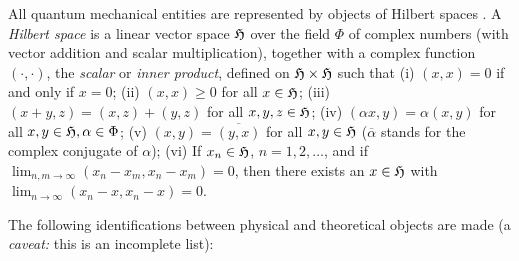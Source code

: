 All quantum
mechanical entities are represented by objects
of Hilbert spaces \cite{v-neumann-49}. A {\em Hilbert space} is a linear
vector space ${\cal H}$ over the field $\Phi$ of complex numbers
(with vector addition
and scalar multiplication), together  with a complex function
$(\cdot ,\cdot
)$, the {\em scalar} or {\em inner product}, defined on ${\cal
H}\times{\cal H}$ such that
(i)
$(x,x)=0$ if and only if $x=0$;
(ii)
$(x,x)\ge 0$ for all $x \in{\cal H}$;
(iii)
$(x+y,z)=(x,z)+(y,z)$ for all $x,y,z \in {\cal H}$;
(iv)
$(\alpha x,y)=\alpha (x,y)$ for all $x,y \in {\cal H}, \alpha \in \Phi$;
(v)
$(x,y)=\overline{(y,x)}$ for all $x,y \in {\cal H}$
($\overline{\alpha }$ stands for the complex conjugate of $\alpha$);
(vi)
If $x_n\in {\cal H}$, $n=1,2,\ldots$, and if $\lim_{n,m\rightarrow
\infty} (x_n-x_m,x_n-x_m)=0$, then there exists an $x\in {\cal H}$ with
$\lim_{n\rightarrow \infty} (x_n-x,x_n-x)=0$.

The following identifications between physical and theoretical objects
are made (a {\it caveat:} this is an incomplete list):

